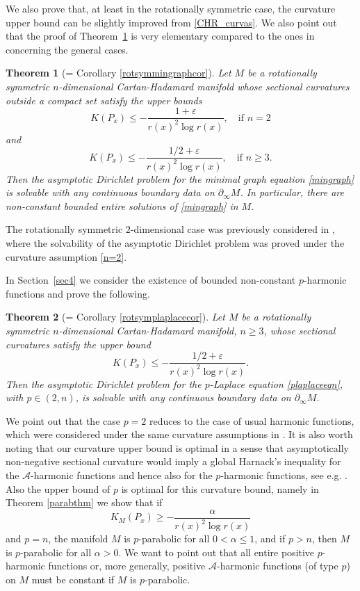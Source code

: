 \documentclass[10pt,a4paper,reqno]{amsart}
\newcommand{\ve}{\varepsilon}
\newcommand{\pinf}{\partial_{\infty}}
\numberwithin{equation}{section}
\theoremstyle{plain}
\newtheorem{thm}{Theorem}[section]
\theoremstyle{definition}
\begin{document}
We also prove that, at least in the rotationally symmetric case, the curvature upper bound can be
slightly improved from \eqref{CHR_curvas}. We also point out that the proof of Theorem~\ref{thm1.5} is very 
elementary compared to the ones in \cite{CHR1} concerning the general cases.
  \begin{thm}[= Corollary \ref{rotsymmingraphcor}]\label{thm1.5}
	Let $M$ be a rotationally symmetric $n$-dimensional Cartan-Hadamard manifold whose sectional curvatures outside a compact set 
	satisfy the upper bounds
	 \begin{equation}\label{n=2}
	K(P_x) \le - \frac{1 + \ve }{r(x)^2 \log r(x)}, \quad \text{if } n=2 
	 \end{equation}
      	and
   	 \begin{equation}\label{n>2}
  	K(P_x) \le - \frac{1/2 + \ve }{r(x)^2 \log r(x)}, \quad \text{if } n\ge3. 	 
   	 \end{equation}
     		Then the asymptotic Dirichlet problem for the minimal graph equation \eqref{mingraph} is
	solvable with any continuous boundary data on $\pinf M$.
In particular, there are non-constant bounded entire solutions of \eqref{mingraph} in $M$.  
  \end{thm}
The rotationally symmetric $2$-dimensional case was previously considered in \cite{RTgeomdedi}, where 
the solvability of the asymptotic Dirichlet problem was proved under the curvature assumption \eqref{n=2}. 

In Section~\ref{sec4} we consider the existence of bounded non-constant $p$-harmonic functions
and prove the following.	
	\begin{thm}[= Corollary \ref{rotsymplaplacecor}]
	Let $M$ be a rotationally symmetric $n$-dimensional Cartan-Hadamard manifold, $n\ge 3$, whose sectional 
	curvatures satisfy the upper bound
   	 \[
     		K(P_x) \le - \frac{1/2 + \ve }{r(x)^2 \log r(x)}.
    	\]
	Then the asymptotic Dirichlet problem for the $p$-Laplace equation \eqref{plaplaceeqn},
	with $p\in (2,n)$, is solvable with any continuous boundary data on $\pinf M$.
	\end{thm}
We point out that the case $p=2$ reduces to the case of usual harmonic
functions, which were considered under the same curvature assumptions in \cite{march}.
It is also worth noting that our curvature upper bound is optimal in a sense that asymptotically
non-negative sectional curvature would imply a global Harnack's inequality for the $\mathcal{A}$-harmonic
functions and hence also for the $p$-harmonic functions, see e.g. \cite[Example 3.1]{holDuke}.
Also the upper bound of $p$ is optimal for this curvature bound, namely in Theorem \ref{parabthm} we show
that if 
  \begin{equation*}
    K_M(P_x) \ge - \frac{\alpha}{r(x)^2 \log r(x)}
  \end{equation*}
and $p=n$, the manifold $M$ is $p$-parabolic for all $0<\alpha\le1$, and if $p>n$, then $M$ is $p$-parabolic
for all $\alpha>0$. We want to point out that all entire positive $p$-harmonic functions or, more generally,
positive $\mathcal{A}$-harmonic functions (of type $p$) on $M$ must be constant if $M$ is $p$-parabolic. 
\end{document}
